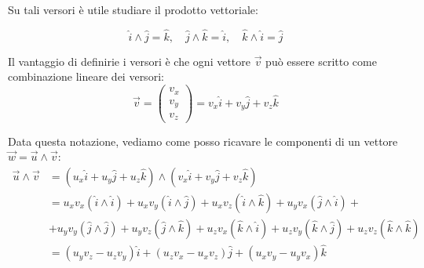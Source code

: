 Su tali versori è utile studiare il prodotto vettoriale:

\begin{minipage}
    {0.45\textwidth}
    \begin{equation*}
        \hat i \wedge \hat j = \hat k, \quad \hat j \wedge \hat k = \hat i, \quad \hat k \wedge \hat i = \hat j
    \end{equation*}
\end{minipage}
\begin{minipage}
    {0.45\textwidth}
    \begin{center}
    \end{center}
\end{minipage}

Il vantaggio di definirie i versori è che ogni vettore $\vec v$ può essere scritto come combinazione lineare dei versori:
\begin{equation*}
    \vec v = \begin{pmatrix}
    v_x \\
    v_y \\
    v_z
    \end{pmatrix} = v_x \hat i + v_y \hat j + v_z \hat k
\end{equation*}

Data questa notazione, vediamo come posso ricavare le componenti di un vettore $\vec w = \vec u \wedge \vec v$:
\begin{align*}
    \vec u \wedge \vec v &= (u_x \hat i + u_y \hat j + u_z \hat k) \wedge (v_x \hat i + v_y \hat j + v_z \hat k) \\
    &= u_x v_x (\hat i \wedge \hat i) + u_x v_y (\hat i \wedge \hat j) + u_x v_z (\hat i \wedge \hat k) + u_y v_x (\hat j \wedge \hat i) + \\
    &+ u_y v_y (\hat j \wedge \hat j) + u_y v_z (\hat j \wedge \hat k) + u_z v_x (\hat k \wedge \hat i) + u_z v_y (\hat k \wedge \hat j) + u_z v_z (\hat k \wedge \hat k) \\
    &= (u_y v_z - u_z v_y) \hat i + (u_z v_x - u_x v_z) \hat j + (u_x v_y - u_y v_x) \hat k
\end{align*}

